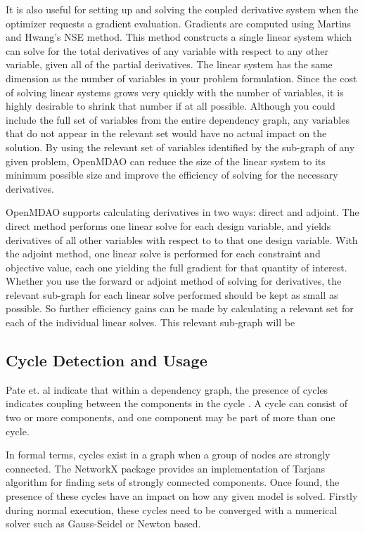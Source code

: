 \documentclass[]{aiaa-tc} %
\begin{document}
    It is also useful for setting up and solving the coupled derivative system when the optimizer requests
    a gradient evaluation. Gradients are computed using Martins and Hwang's NSE method\cite{Martins2012}. This
    method constructs a single linear system which can solve for the total derivatives of any variable with
    respect to any other variable, given all of the partial derivatives. The linear system has the same dimension
    as the number of variables in your problem formulation. Since the cost of solving linear systems grows very
    quickly with the number of variables, it is highly desirable to shrink that number if at all possible.
    Although you could include the full set of variables from the entire dependency graph, any variables that do
    not appear in the relevant set would have no actual impact on the solution. By using the relevant set
    of variables identified by the sub-graph of any given problem, OpenMDAO can
    reduce the size of the linear system to its minimum possible size and improve the efficiency
    of solving for the necessary derivatives.

    OpenMDAO supports calculating derivatives in two ways: direct and adjoint. The direct method performs
    one linear solve for each design variable, and yields derivatives of all other variables with respect to
    to that one design variable. With the adjoint method, one linear solve is performed for each constraint and
    objective value, each one yielding the full gradient for that quantity of interest. Whether you use the forward
    or adjoint method of solving for derivatives, the relevant sub-graph for each linear solve performed should be
    kept as small as possible. So further efficiency gains can be made by calculating a relevant set for each
    of the individual linear solves. This relevant sub-graph will be


    \subsection{Cycle Detection and Usage}
    Pate et. al indicate that within a dependency graph, the presence of cycles indicates coupling between
    the components in the cycle \cite{graph_problem2013}. A cycle can consist of two or more components, and
    one component may be part of more than one cycle.

    In formal terms, cycles exist in a graph when a group of nodes are strongly connected. The NetworkX package
    provides an implementation of Tarjans algorithm for finding sets of strongly connected
    components\cite{tarjan1972depth,nuutila1994finding}. Once found, the presence of these cycles
    have an impact on how any given model is solved. Firstly during normal execution, these cycles
    need to be converged with a numerical solver such as Gauss-Seidel or Newton based.
\end{document}
